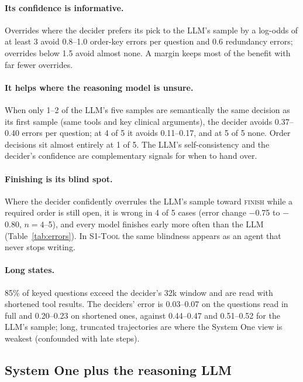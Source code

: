 \documentclass[11pt]{article}
\newcommand{\tool}{\textsc{S1-Tool}}
\begin{document}
\paragraph{Its confidence is informative.} Overrides where the decider prefers its pick to the LLM's sample by a
log-odds of at least 3 avoid 0.8--1.0 order-key errors per question and 0.6 redundancy errors; overrides below 1.5
avoid almost none. A margin keeps most of the benefit with far fewer overrides.

\paragraph{It helps where the reasoning model is unsure.} When only 1--2 of the LLM's five samples are semantically
the same decision as its first sample (same tools and key clinical arguments), the decider avoids 0.37--0.40 errors
per question; at 4 of 5 it avoids 0.11--0.17, and at 5 of 5 none. Order decisions sit almost entirely at 1 of 5. The
LLM's self-consistency and the decider's confidence are complementary signals for when to hand over.

\paragraph{Finishing is its blind spot.} Where the decider confidently overrules the LLM's sample toward
\textsc{finish} while a required order is still open, it is wrong in 4 of 5 cases (error change $-$0.75 to $-$0.80,
$n=4$--5), and every model finishes early more often than the LLM (Table~\ref{tab:errors}). In \tool{} the same
blindness appears as an agent that never stops writing.

\paragraph{Long states.} 85\% of keyed questions exceed the decider's 32k window and are read with shortened tool
results. The deciders' error is 0.03--0.07 on the questions read in full and 0.20--0.23 on shortened ones, against
0.44--0.47 and 0.51--0.52 for the LLM's sample; long, truncated trajectories are where the System One view is weakest
(confounded with late steps).



\subsection{System One plus the reasoning LLM}\label{sec:gate}
\end{document}
